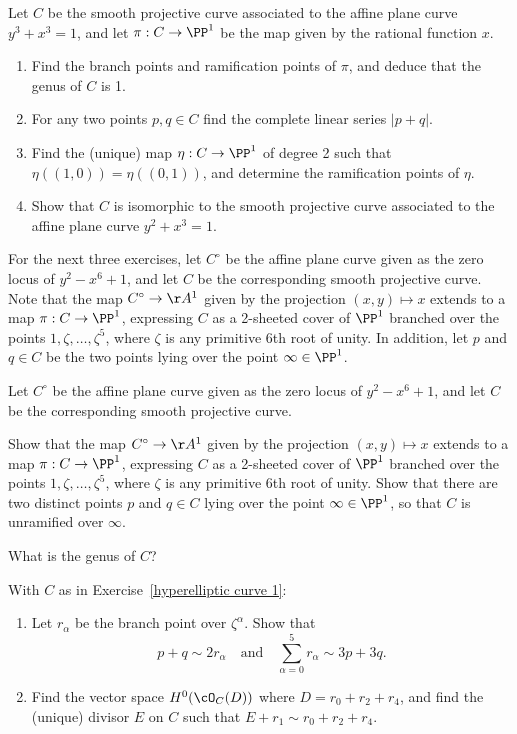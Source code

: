 \begin{exercise}
Let $C$ be the smooth projective curve associated to the affine plane curve $y^3 +x^3 = 1$, and let $\pi : C \to \PP^1$ be the map given by the rational function $x$.
\begin{enumerate}
\item Find the branch points and ramification points of $\pi$, and deduce that the genus of $C$ is 1.
\item For any two points $p, q \in C$ find the complete linear series $|p+q|$.
\item Find the (unique) map $\eta : C \to \PP^1$ of degree 2 such that $\eta((1,0)) = \eta((0,1))$, and determine the ramification points of $\eta$.
\item Show that $C$ is isomorphic to the smooth projective curve associated to the affine plane curve $y^2 +x^3 = 1$.
\end{enumerate}
\end{exercise}

For the next three exercises, let $C^\circ$ be the affine plane curve given as the zero locus of $y^2 - x^6 +1$, and let $C$ be the corresponding smooth projective curve. Note that the map $C^\circ \to \AA^1$ given by the projection $(x,y) \mapsto x$ extends to a map $\pi : C \to \PP^1$, expressing $C$ as a 2-sheeted cover of $\PP^1$ branched over the points $1, \zeta, \dots, \zeta^5$, where $\zeta$ is any primitive 6th root of unity. In addition, let $p$ and $q \in C$ be the two points lying over the point $\infty \in \PP^1$.

\begin{exercise}\label{hyperelliptic curve 1}
Let $C^\circ$ be the affine plane curve given as the zero locus of $y^2 - x^6 +1$, and let $C$ be the corresponding smooth projective curve. 

Show  that the map $C^\circ \to \AA^1$ given by the projection $(x,y) \mapsto x$ extends to a map $\pi : C \to \PP^1$, expressing $C$ as a 2-sheeted cover of $\PP^1$ branched over the points $1, \zeta, \dots, \zeta^5$, where $\zeta$ is any primitive 6th root of unity. Show that there are two distinct points $p$ and $q \in C$  lying over the point $\infty \in \PP^1$,
so that $C$ is unramified over $\infty$.

What is the genus of $C$?
\end{exercise}

\begin{exercise} With $C$ as in Exercise~\ref{hyperelliptic curve 1}:
\begin{enumerate}

\item Let $r_\alpha$ be the branch point over $\zeta^\alpha$. Show that
$$
p+q \sim 2r_\alpha \quad \text{and} \quad \sum_{\alpha = 0}^5 r_\alpha \sim 3p+3q.
$$

\item Find the vector space $H^0(\cO_C(D))$ where $D = r_0 + r_2 + r_4$, and find the (unique) divisor $E$ on $C$ such that $E + r_1 \sim r_0 + r_2 + r_4$.

\end{enumerate}

\end{exercise}

